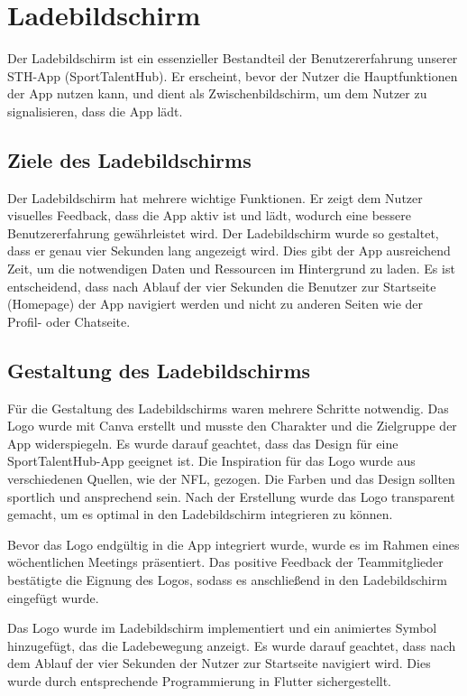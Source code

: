 \chapter{Ladebildschirm}

Der Ladebildschirm ist ein essenzieller Bestandteil der Benutzererfahrung unserer STH-App (SportTalentHub). Er erscheint, bevor der Nutzer die Hauptfunktionen der App nutzen kann, und dient als Zwischenbildschirm, um dem Nutzer zu signalisieren, dass die App lädt.

\section{Ziele des Ladebildschirms}

Der Ladebildschirm hat mehrere wichtige Funktionen. Er zeigt dem Nutzer visuelles Feedback, dass die App aktiv ist und lädt, wodurch eine bessere Benutzererfahrung gewährleistet wird. Der Ladebildschirm wurde so gestaltet, dass er genau vier Sekunden lang angezeigt wird. Dies gibt der App ausreichend Zeit, um die notwendigen Daten und Ressourcen im Hintergrund zu laden. Es ist entscheidend, dass nach Ablauf der vier Sekunden die Benutzer zur Startseite (Homepage) der App navigiert werden und nicht zu anderen Seiten wie der Profil- oder Chatseite.

\section{Gestaltung des Ladebildschirms}

Für die Gestaltung des Ladebildschirms waren mehrere Schritte notwendig. Das Logo wurde mit Canva erstellt und musste den Charakter und die Zielgruppe der App widerspiegeln. Es wurde darauf geachtet, dass das Design für eine SportTalentHub-App geeignet ist. Die Inspiration für das Logo wurde aus verschiedenen Quellen, wie der NFL, gezogen. Die Farben und das Design sollten sportlich und ansprechend sein. Nach der Erstellung wurde das Logo transparent gemacht, um es optimal in den Ladebildschirm integrieren zu können.

Bevor das Logo endgültig in die App integriert wurde, wurde es im Rahmen eines wöchentlichen Meetings präsentiert. Das positive Feedback der Teammitglieder bestätigte die Eignung des Logos, sodass es anschließend in den Ladebildschirm eingefügt wurde.

Das Logo wurde im Ladebildschirm implementiert und ein animiertes Symbol hinzugefügt, das die Ladebewegung anzeigt. Es wurde darauf geachtet, dass nach dem Ablauf der vier Sekunden der Nutzer zur Startseite navigiert wird. Dies wurde durch entsprechende Programmierung in Flutter sichergestellt.

